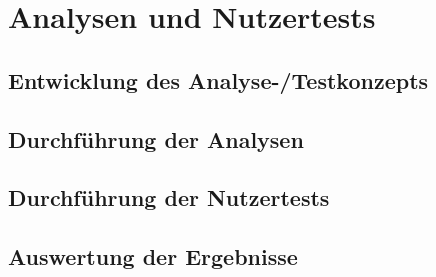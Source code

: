 \chapter{Analysen und Nutzertests}
\section{Entwicklung des Analyse-/Testkonzepts} \label{sec:analysisConcept}

\section{Durchführung der Analysen} \label{sec:analysisExecution}

\section{Durchführung der Nutzertests} \label{sec:testExecution}

\section{Auswertung der Ergebnisse} \label{sec:analysisConclusion}